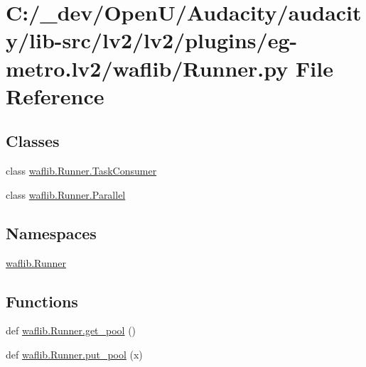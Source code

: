 \hypertarget{lv2_2plugins_2eg-metro_8lv2_2waflib_2_runner_8py}{}\section{C\+:/\+\_\+dev/\+Open\+U/\+Audacity/audacity/lib-\/src/lv2/lv2/plugins/eg-\/metro.lv2/waflib/\+Runner.py File Reference}
\label{lv2_2plugins_2eg-metro_8lv2_2waflib_2_runner_8py}
\subsection*{Classes}
\begin{DoxyCompactItemize}
\item 
class \hyperlink{classwaflib_1_1_runner_1_1_task_consumer}{waflib.\+Runner.\+Task\+Consumer}
\item 
class \hyperlink{classwaflib_1_1_runner_1_1_parallel}{waflib.\+Runner.\+Parallel}
\end{DoxyCompactItemize}
\subsection*{Namespaces}
\begin{DoxyCompactItemize}
\item 
 \hyperlink{namespacewaflib_1_1_runner}{waflib.\+Runner}
\end{DoxyCompactItemize}
\subsection*{Functions}
\begin{DoxyCompactItemize}
\item 
def \hyperlink{namespacewaflib_1_1_runner_a30bf6bcb906d0ab627890f2174b1e463}{waflib.\+Runner.\+get\+\_\+pool} ()
\item 
def \hyperlink{namespacewaflib_1_1_runner_a1e26175912d7655d9c38a50d71caeb6f}{waflib.\+Runner.\+put\+\_\+pool} (x)
\end{DoxyCompactItemize}
